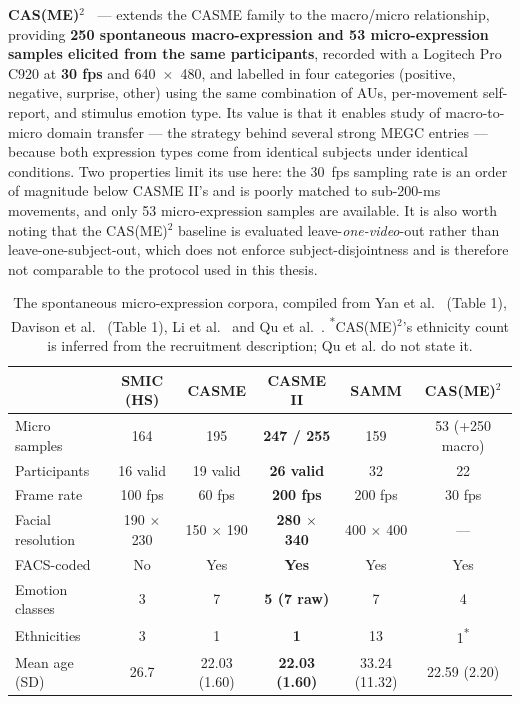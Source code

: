 \textbf{CAS(ME)$^2$~\cite{qu2016}} --- extends the CASME family to the macro/micro relationship, providing \textbf{250 spontaneous macro-expression and 53 micro-expression samples elicited from the same participants}, recorded with a Logitech Pro C920 at \textbf{30 fps} and 640~$\times$~480, and labelled in four categories (positive, negative, surprise, other) using the same combination of AUs, per-movement self-report, and stimulus emotion type. Its value is that it enables study of macro-to-micro domain transfer --- the strategy behind several strong MEGC entries --- because both expression types come from identical subjects under identical conditions. Two properties limit its use here: the 30~fps sampling rate is an order of magnitude below CASME II's and is poorly matched to sub-200-ms movements, and only 53 micro-expression samples are available. It is also worth noting that the CAS(ME)$^2$ baseline is evaluated leave-\textit{one-video}-out rather than leave-one-subject-out, which does not enforce subject-disjointness and is therefore not comparable to the protocol used in this thesis.

\begin{table}[htbp]
	\centering
	\begin{tabular}{l c c c c c}
		\hline
		 & \textbf{SMIC (HS)} & \textbf{CASME} & \textbf{CASME II} & \textbf{SAMM} & \textbf{CAS(ME)$^2$} \\
		\hline
		Micro samples     & 164        & 195        & \textbf{247 / 255}       & 159             & 53 (+250 macro) \\
		Participants      & 16 valid   & 19 valid   & \textbf{26 valid}        & 32              & 22 \\
		Frame rate        & 100 fps    & 60 fps     & \textbf{200 fps}         & 200 fps         & 30 fps \\
		Facial resolution & 190 $\times$ 230 & 150 $\times$ 190 & \textbf{280 $\times$ 340} & 400 $\times$ 400 & --- \\
		FACS-coded        & No         & Yes        & \textbf{Yes}             & Yes             & Yes \\
		Emotion classes   & 3          & 7          & \textbf{5 (7 raw)}       & 7               & 4 \\
		Ethnicities       & 3          & 1          & \textbf{1}               & 13              & 1\textsuperscript{*} \\
		Mean age (SD)     & 26.7       & 22.03 (1.60) & \textbf{22.03 (1.60)}  & 33.24 (11.32)   & 22.59 (2.20) \\
		\hline
	\end{tabular}
	\caption[The spontaneous micro-expression corpora]{The spontaneous micro-expression corpora, compiled from Yan et al.~\cite{yan2014} (Table 1), Davison et al.~\cite{davison2018} (Table 1), Li et al.~\cite{liX2013} and Qu et al.~\cite{qu2016}. \textsuperscript{*}CAS(ME)$^2$'s ethnicity count is inferred from the recruitment description; Qu et al. do not state it.}
	\label{tab:spontaneous-corpora}
\end{table}

